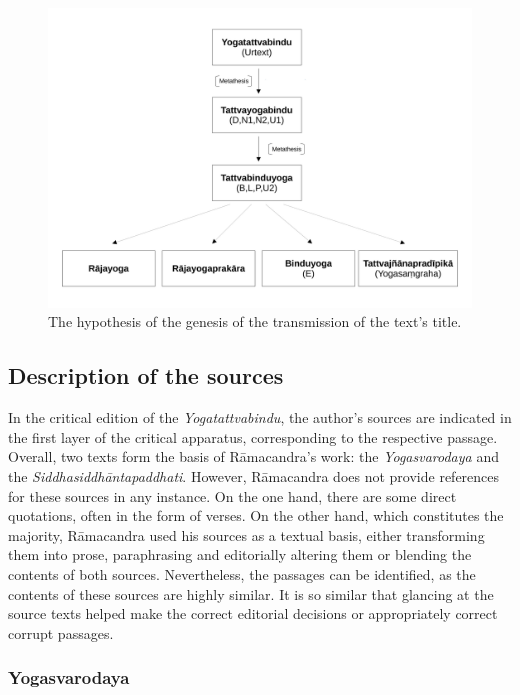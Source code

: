  \begin{figure}[h!]
    \centering
    \includegraphics[width=1\textwidth]{pics/titel-hypothese.pdf} %
    \caption{The hypothesis of the genesis of the transmission of the text's title.}
    \label{fig:titel-hypothese}
\end{figure}

\subsection{Description of the sources}

In the critical edition of the \emph{Yogatattvabindu}, the author's sources are indicated in the first layer of the critical apparatus, corresponding to the respective passage. Overall, two texts form the basis of Rāmacandra's work: the \emph{Yogasvarodaya} and the \emph{Siddhasiddhāntapaddhati}. However, Rāmacandra does not provide references for these sources in any instance. On the one hand, there are some direct quotations, often in the form of verses. On the other hand, which constitutes the majority, Rāmacandra used his sources as a textual basis, either transforming them into prose, paraphrasing and editorially altering them or blending the contents of both sources. Nevertheless, the passages can be identified, as the contents of these sources are highly similar. It is so similar that glancing at the source texts helped make the correct editorial decisions or appropriately correct corrupt passages.

\subsubsection{Yogasvarodaya}

